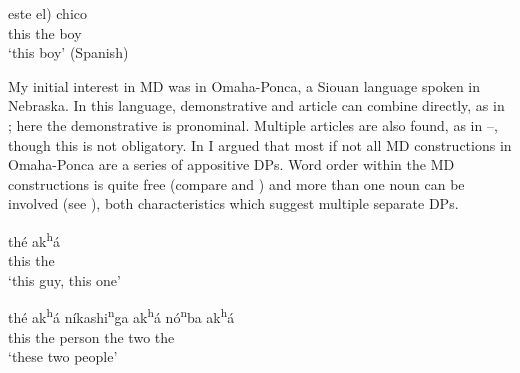 \documentclass[output=paper,
colorlinks,
citecolor=brown,
newtxmath
]{langscibook}
\begin{document}
\ex
\gll este \minsp{(*} el) chico \\
    this {} the boy \\     %
\glt `this  boy' \hfill (Spanish)
\z
\z

 \noindent My initial interest in MD was in Omaha-Ponca, a Siouan language spoken in Nebraska. In this language, demonstrative and article can combine directly, as in ; here the demonstrative is pronominal. Multiple articles are also found, as in --, though this is not obligatory. In \citet{Rudin1993} I argued that most if not all MD constructions in Omaha-Ponca are a series of appositive DPs. Word order within the MD constructions is quite free (compare  and ) and more than one noun can be involved (see ), both characteristics which suggest multiple separate DPs.







\ea \label{ex:Omaha}
\ea \label{thisguy}
\gll thé ak\textsuperscript{h}á \\
     this the\\
     \glt `this  guy, this one' %

\ex \label{akha1}
\gll thé ak\textsuperscript{h}á níkashi\textsuperscript{n}ga ak\textsuperscript{h}á nó\textsuperscript{n}ba ak\textsuperscript{h}á\\
    this the person the two the \\
\glt `these two people'
\end{document}
